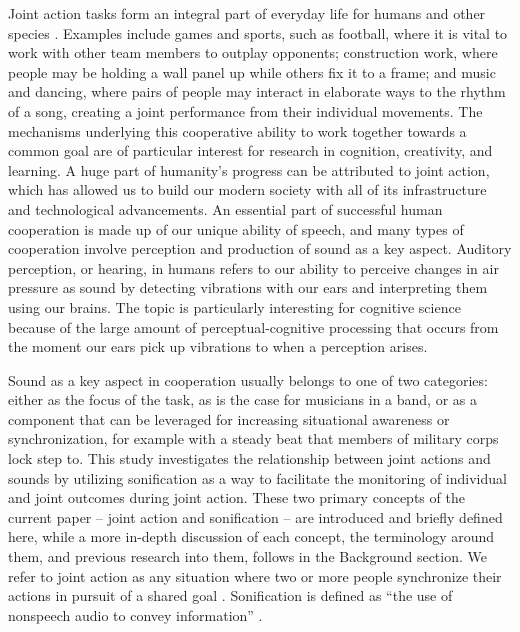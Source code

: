\documentclass[10pt,a4paper,onecolumn]{article}
\begin{document}
Joint action tasks form an integral part of everyday life for humans \autocite{vanderwelUnderstandingJointAction2021} and other species \autocite{ferrari-tonioloTwoBrainsAction2019}. Examples include games and sports, such as football, where it is vital to work with other team members to outplay opponents; construction work, where people may be holding a wall panel up while others fix it to a frame; and music and dancing, where pairs of people may interact in elaborate ways to the rhythm of a song, creating a joint performance from their individual movements. The mechanisms underlying this cooperative ability to work together towards a common goal are of particular interest for research in cognition, creativity, and learning. A huge part of humanity's progress can be attributed to joint action, which has allowed us to build our modern society with all of its infrastructure and technological advancements. An essential part of successful human cooperation is made up of our unique ability of speech, and many types of cooperation involve perception and production of sound as a key aspect. Auditory perception, or hearing, in humans refers to our ability to perceive changes in air pressure as sound by detecting vibrations with our ears and interpreting them using our brains. The topic is particularly interesting for cognitive science because of the large amount of perceptual-cognitive processing that occurs from the moment our ears pick up vibrations to when a perception arises.

Sound as a key aspect in cooperation usually belongs to one of two categories: either as the focus of the task, as is the case for musicians in a band, or as a component that can be leveraged for increasing situational awareness or synchronization, for example with a steady beat that members of military corps lock step to. This study investigates the relationship between joint actions and sounds by utilizing sonification as a way to facilitate the monitoring of individual and joint outcomes during joint action. These two primary concepts of the current paper -- joint action and sonification -- are introduced and briefly defined here, while a more in-depth discussion of each concept, the terminology around them, and previous research into them, follows in the Background section. We refer to joint action as any situation where two or more people synchronize their actions in pursuit of a shared goal \autocite{knoblichPsychologicalResearchJoint2011}. Sonification is defined as ``the use of nonspeech audio to convey information'' \autocite[p.~4]{kramerSonificationReportStatus1999}.
\end{document}
